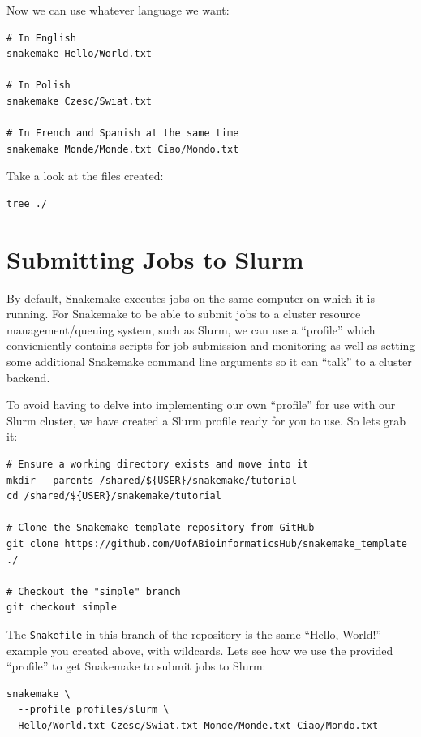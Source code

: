 Now we can use whatever language we want:

\begin{lstlisting}
# In English
snakemake Hello/World.txt

# In Polish
snakemake Czesc/Swiat.txt

# In French and Spanish at the same time
snakemake Monde/Monde.txt Ciao/Mondo.txt
\end{lstlisting}

Take a look at the files created:

\begin{lstlisting}
tree ./
\end{lstlisting}

\section{Submitting Jobs to Slurm}

By default, Snakemake executes jobs on the same computer on which it is running. For Snakemake to be able to
submit jobs to a cluster resource management/queuing system, such as Slurm, we can use a ``profile'' which
convieniently contains scripts for job submission and monitoring as well as setting some additional Snakemake
command line arguments so it can ``talk'' to a cluster backend.

To avoid having to delve into implementing our own ``profile'' for use with our Slurm cluster, we have created
a Slurm profile ready for you to use. So lets grab it:

\begin{lstlisting}
# Ensure a working directory exists and move into it
mkdir --parents /shared/${USER}/snakemake/tutorial
cd /shared/${USER}/snakemake/tutorial

# Clone the Snakemake template repository from GitHub
git clone https://github.com/UofABioinformaticsHub/snakemake_template ./

# Checkout the "simple" branch
git checkout simple
\end{lstlisting}

The \texttt{Snakefile} in this branch of the repository is the same ``Hello, World!'' example you created above,
with wildcards. Lets see how we use the provided ``profile'' to get Snakemake to submit jobs to Slurm:

\begin{lstlisting}
snakemake \
  --profile profiles/slurm \
  Hello/World.txt Czesc/Swiat.txt Monde/Monde.txt Ciao/Mondo.txt
\end{lstlisting}


